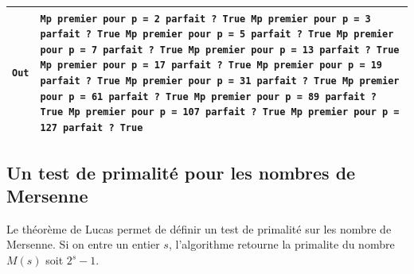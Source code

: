 \documentclass[titlepage]{article}
\begin{document}
    \begin{tabularx}{12cm}{|p{0.60cm}|X|}
        \hline
        \texttt{Out}
        &
        \texttt{Mp premier pour p = 2\newline
        parfait ? True\newline
        Mp premier pour p = 3\newline
        parfait ? True\newline
        Mp premier pour p = 5\newline
        parfait ? True\newline
        Mp premier pour p = 7\newline
        parfait ? True\newline
        Mp premier pour p = 13\newline
        parfait ? True\newline
        Mp premier pour p = 17\newline
        parfait ? True\newline
        Mp premier pour p = 19\newline
        parfait ? True\newline
        Mp premier pour p = 31\newline
        parfait ? True\newline
        Mp premier pour p = 61\newline
        parfait ? True\newline
        Mp premier pour p = 89\newline
        parfait ? True\newline
        Mp premier pour p = 107\newline
        parfait ? True\newline
        Mp premier pour p = 127\newline
        parfait ? True}
        \\
        \hline
    \end{tabularx}
    \bigbreak

    \subsection{Un test de primalité pour les nombres de Mersenne}

    Le théorème de Lucas permet de définir un test de primalité sur les nombre de Mersenne.
    Si on entre un entier $s$, l'algorithme retourne la primalite du nombre $M(s)$ soit $2^s -1$.

    
\end{document}
